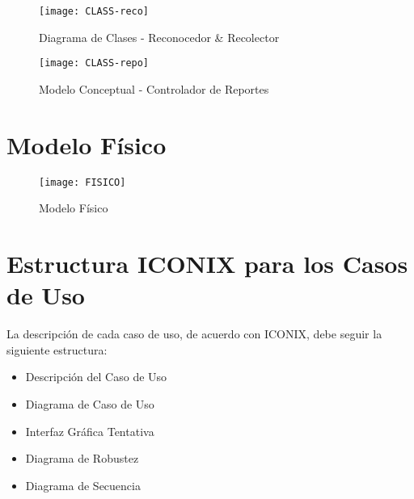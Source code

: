  \begin{figure}[H]
        \centering
        \texttt{[image: CLASS-reco]}
        \caption{Diagrama de Clases - Reconocedor \& Recolector}
        \label{fig:class-reconocedor}
    \end{figure}


 \begin{figure}[H]
        \centering
        \texttt{[image: CLASS-repo]}
        \caption{Modelo Conceptual - Controlador de Reportes}
        \label{fig:CLASS-repo}
    \end{figure}
    

 
\section{Modelo Físico}
    \begin{figure}[H]
        \centering
        \texttt{[image: FISICO]}
        \caption{Modelo Físico}
        \label{fig:FISICO}
    \end{figure}

\section{Estructura ICONIX para los Casos de Uso}
La descripción de cada caso de uso, de acuerdo con ICONIX, debe seguir la siguiente estructura: 
\begin{itemize}
    \item Descripción del Caso de Uso
    \item Diagrama de Caso de Uso
    \item Interfaz Gráfica Tentativa
    \item Diagrama de Robustez
    \item Diagrama de Secuencia
\end{itemize}
